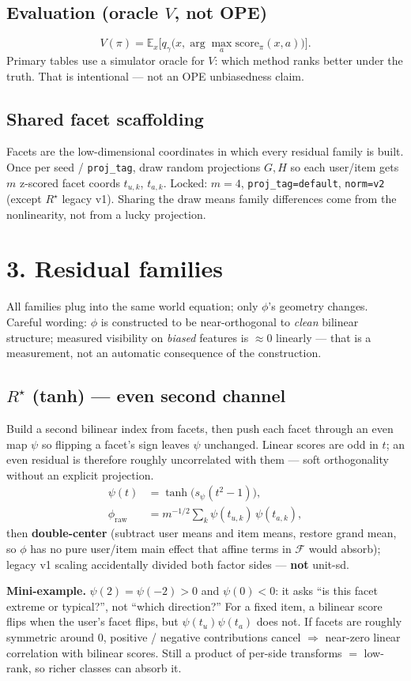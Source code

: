 \documentclass[11pt]{article}
\newcommand{\phonesection}[1]{\Needspace{8\baselineskip}\section*{#1}}
\newcommand{\phonesub}[1]{\Needspace{6\baselineskip}\subsection*{#1}}
\newcommand{\Rstar}{R^{\star}}
\newcommand{\miniex}[1]{\par{\footnotesize\color{black!70}\textbf{Mini-example.} #1\par}}
\begin{document}
\phonesub{Evaluation (oracle $V$, not OPE)}
\begin{equation*}
V(\pi)
  = \mathbb{E}_{x}\!\Big[
      q_{\gamma}\!\big(x,\arg\max_{a}
      \mathrm{score}_{\pi}(x,a)\big)
    \Big].
\end{equation*}
Primary tables use a simulator oracle for
$V$: which method ranks better under the
truth.  That is intentional --- not an OPE
unbiasedness claim.

\phonesub{Shared facet scaffolding}
Facets are the low-dimensional coordinates
in which every residual family is built.
Once per seed / \texttt{proj\_tag}, draw
random projections $G,H$ so each user/item
gets $m$ z-scored facet coords $t_{u,k}$,
$t_{a,k}$.  Locked: $m{=}4$,
\texttt{proj\_tag=default}, \texttt{norm=v2}
(except $\Rstar$ legacy v1).  Sharing the
draw means family differences come from the
nonlinearity, not from a lucky projection.

\phonesection{3. Residual families}

All families plug into the same world
equation; only $\phi$'s geometry changes.
Careful wording: $\phi$ is constructed to be
near-orthogonal to \emph{clean} bilinear
structure; measured visibility on
\emph{biased} features is $\approx 0$
linearly --- that is a measurement, not an
automatic consequence of the construction.

\phonesub{$\Rstar$ (tanh) --- even second channel}
Build a second bilinear index from facets,
then push each facet through an even map
$\psi$ so flipping a facet's sign leaves
$\psi$ unchanged.  Linear scores are odd in
$t$; an even residual is therefore roughly
uncorrelated with them --- soft orthogonality
without an explicit projection.
\begin{align*}
\psi(t)
  &= \tanh\!\big(s_{\psi}(t^{2}-1)\big),\\
\phi_{\mathrm{raw}}
  &= m^{-1/2}\sum_{k}
     \psi(t_{u,k})\,\psi(t_{a,k}),
\end{align*}
then \textbf{double-center} (subtract user
means and item means, restore grand mean, so
$\phi$ has no pure user/item main effect
that affine terms in $\mathcal{F}$ would
absorb); legacy v1 scaling accidentally
divided both factor sides --- \textbf{not}
unit-sd.

\miniex{$\psi(2)=\psi(-2)>0$ and
$\psi(0)<0$: it asks ``is this facet extreme
or typical?'', not ``which direction?''
For a fixed item, a bilinear score flips
when the user's facet flips, but
$\psi(t_u)\psi(t_a)$ does not.  If facets
are roughly symmetric around 0, positive /
negative contributions cancel $\Rightarrow$
near-zero linear correlation with bilinear
scores.  Still a product of per-side
transforms $=$ low-rank, so richer classes
can absorb it.}
\end{document}
